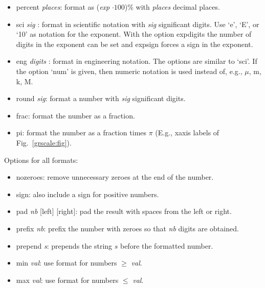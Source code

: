 \begin{commanddescription}
\begin{itemize}
\item {\sf percent} {\it places}: format as ({\it exp} $\cdot 100$)\% with {\it places} decimal places.

\item {\sf sci} {\it sig} {\sf [e,E,10]} {} {\sf [expsign]}: format in scientific notation with {\it sig} significant digits. Use `e', `E', or `10' as notation for the exponent. With the option {\sf expdigits} the number of digits in the exponent can be set and {\sf expsign} forces a sign in the exponent.

\item {\sf eng} {\it digits} {\sf [e,E,10]} {} {\sf [expsign]} {\sf [num]}: format in engineering notation. The options are similar to `sci'. If the option `num' is given, then numeric notation is used instead of, e.g., $\mu$, m, k, M.

\item {\sf round} {\it sig}: format a number with {\it sig} significant digits.

\item {\sf frac}: format the number as a fraction.

\item {\sf pi}: format the number as a fraction times $\pi$ (E.g., xaxis labels of Fig.~\ref{grscale:fig}).
\end{itemize}

Options for all formats:
\begin{itemize}
\item {\sf nozeroes}: remove unnecessary zeroes at the end of the number.

\item {\sf sign}: also include a sign for positive numbers.

\item {\sf pad {\it nb} [left] [right]}: pad the result with spaces from the left or right.

\item {\sf prefix {\it nb}}: prefix the number with zeroes so that {\it nb} digits are obtained.

\item {\sf prepend {\it s}}: prepends the string $s$ before the formatted number.

\item {\sf min {\it val}}: use format for numbers $\ge$ {\it val}.

\item {\sf max {\it val}}: use format for numbers $\le$ {\it val}.
\end{itemize}


\end{commanddescription}
